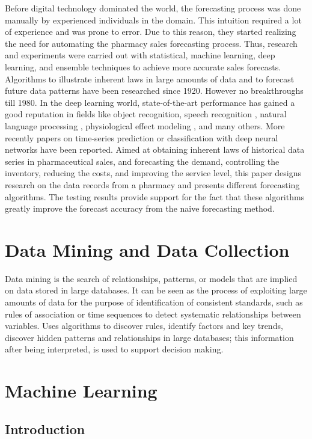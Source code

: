 \documentclass[12pt]{report}
\begin{document}
Before digital technology dominated the world, the forecasting process was done manually by experienced individuals in the domain. This intuition required a lot of experience and was prone to error. Due to this reason, they started realizing the need for automating the pharmacy sales forecasting process. 
Thus, research and experiments were carried out with statistical, machine learning, deep learning, and ensemble techniques to achieve more accurate sales forecasts. \cite{2}
Algorithms to illustrate inherent laws in large amounts of data and to forecast future data patterns have been researched since 1920. However no breakthroughs till 1980. \cite{3}
In the deep learning world, state-of-the-art performance has gained a good reputation in fields like object recognition, \cite{4} speech recognition \cite{5}, natural language processing \cite{6},
physiological effect modeling \cite{7}, and many others. More recently papers on time-series prediction or classification with deep neural networks have been reported. \cite{8,9,10,11}
Aimed at obtaining inherent laws of historical data series in pharmaceutical sales, and forecasting the demand, controlling the inventory, reducing the costs, and improving the service level, this paper designs research on the data records from a pharmacy and presents different forecasting algorithms. The testing results provide support for the fact that these algorithms greatly improve the forecast accuracy from the naive forecasting method.

\section{Data Mining and Data Collection}

Data mining is the search of relationships, patterns, or models that are implied on data stored
in large databases. It can be seen as the process of exploiting large amounts of data for the
purpose of identification of consistent standards, such as rules of association or time sequences
to detect systematic relationships between variables. Uses algorithms to discover rules, identify
factors and key trends, discover hidden patterns and relationships in large databases; this
information after being interpreted, is used to support decision making.

\section{Machine Learning}

\subsection{Introduction}
\end{document}
